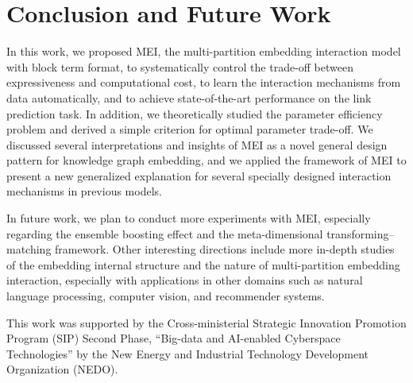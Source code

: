 \documentclass{ecai}
\theoremstyle{plain}  \newtheorem{thm}{Theorem}  \newtheorem{lem}[thm]{Lemma}  \newtheorem{prop}[thm]{Proposition}
\theoremstyle{remark}  \newtheorem*{rem}{Remark}
\begin{document}
\section{Conclusion and Future Work} \label{sect:conclusion} In this work, we proposed MEI, the multi-partition embedding interaction model with block term format, to systematically control the trade-off between expressiveness and computational cost, to learn the interaction mechanisms from data automatically, and to achieve state-of-the-art performance on the link prediction task. In addition, we theoretically studied the parameter efficiency problem and derived a simple criterion for optimal parameter trade-off. We discussed several interpretations and insights of MEI as a novel general design pattern for knowledge graph embedding, and we applied the framework of MEI to present a new generalized explanation for several specially designed interaction mechanisms in previous models.

In future work, we plan to conduct more experiments with MEI, especially regarding the ensemble boosting effect and the meta-dimensional transforming--matching framework. Other interesting directions include more in-depth studies of the embedding internal structure and the nature of multi-partition embedding interaction, especially with applications in other domains such as natural language processing, computer vision, and recommender systems.


\ack
This work was supported by the Cross-ministerial Strategic Innovation Promotion Program (SIP) Second Phase, ``Big-data and AI-enabled Cyberspace Technologies'' by the New Energy and Industrial Technology Development Organization (NEDO).
\end{document}
